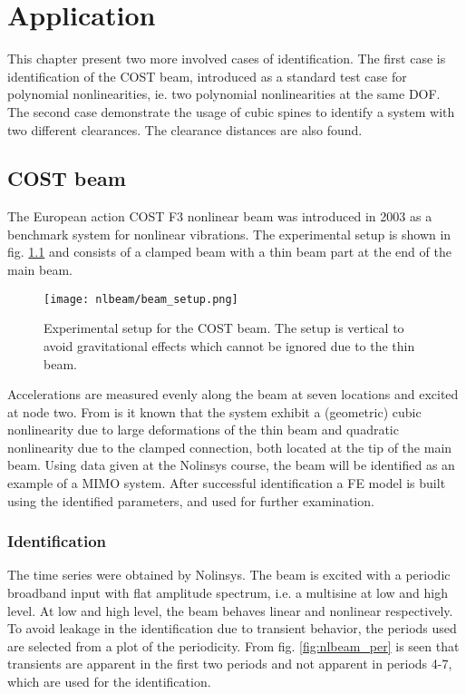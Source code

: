 
\chapter{Application}
\label{cha:application}

This chapter present two more involved cases of identification. The first case
is identification of the COST beam, introduced as a standard test case for
polynomial nonlinearities, ie. two polynomial nonlinearities at the same DOF.
The second case demonstrate the usage of cubic spines to identify a system with
two different clearances. The clearance distances are also found.


\section{COST beam}
\label{sec:cost-beam}

The European action COST F3 nonlinear beam \autocite{GOLINVAL2003} was
introduced in 2003 as a benchmark system for nonlinear vibrations. The
experimental setup is shown in fig. \ref{fig:beam_setup} and consists of a
clamped beam with a thin beam part at the end of the main beam.

\begin{figure}[!ht]
  \centering
  \texttt{[image: nlbeam/beam\_setup.png]}
  \caption{Experimental setup for the COST beam. The setup is vertical to avoid
    gravitational effects which cannot be ignored due to the thin beam.}
  \label{fig:beam_setup}
\end{figure}

Accelerations are measured evenly along the beam at seven locations and excited
at node two.
From \textcite{lenaerts2003a} is it known that the system exhibit a (geometric)
cubic nonlinearity due to large deformations of the thin beam and quadratic
nonlinearity due to the clamped connection, both located at the tip of the main
beam. Using data given at the Nolinsys course, the beam will be identified as an
example of a MIMO system. After successful identification a FE model is built
using the identified parameters, and used for further examination.


\subsection{Identification}

The time series were obtained by Nolinsys. The beam is excited with a periodic
broadband input with flat amplitude spectrum, i.e. a multisine at low and high
level. At low and high level, the beam behaves linear and nonlinear
respectively. To avoid leakage in the identification due to transient behavior,
the periods used are selected from a plot of the periodicity. From fig.
\ref{fig:nlbeam_per} is seen that transients are apparent in the first two
periods and not apparent in periods 4-7, which are used for the identification.

